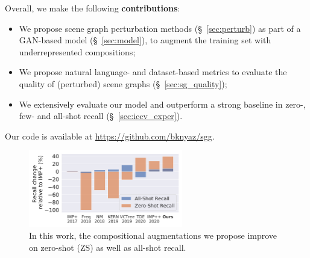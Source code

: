 Overall, we make the following \textbf{contributions}:
\vspace{-2pt}
\begin{itemize}[labelsep=1pt]
	\vspace{-5pt}
	\itemsep0em
	\item We propose scene graph perturbation methods (\S~\ref{sec:perturb}) as part of a GAN-based model (\S~\ref{sec:model}), to augment the training set with underrepresented compositions;
	\vspace{-3pt}
	\item We propose natural language- and dataset-based metrics to evaluate the quality of (perturbed) scene graphs (\S~\ref{sec:sg_quality});
	\vspace{-3pt}
	\item We extensively evaluate our model and outperform a strong baseline in zero-, few- and all-shot recall (\S~\ref{sec:iccv_exper}).
	\vspace{-5pt}
\end{itemize}

Our code is available at {\url{https://github.com/bknyaz/sgg}}.

\begin{figure}
\begin{scriptsize}
\begin{center}
\includegraphics[width=0.6\textwidth]{results_history.pdf}\vspace{-15pt}
\end{center}
		
\end{scriptsize}
\vspace{-5pt}
\caption{\small In this work, the compositional augmentations we propose improve on zero-shot (ZS) as well as all-shot recall.}
\vspace{-10pt}
\label{fig:history}
\end{figure}


